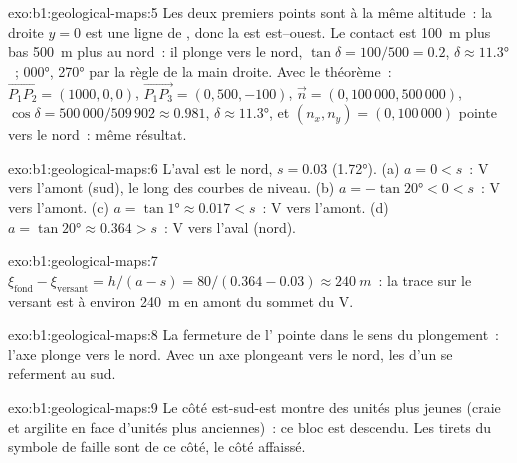 \begin{solution}{exo:b1:geological-maps:5}
Les deux premiers points sont à la même altitude~: la droite $y = 0$ est une
ligne de , donc la  est est--ouest. Le contact est \qty{100}{m}
plus bas \qty{500}{m} plus au nord~: il plonge vers le nord,
$\tan\delta = 100/500 = 0.2$, $\delta \approx \ang{11.3}$~; 
\ang{000},  \ang{270} par la règle de la main droite. Avec le
théorème~: $\overrightarrow{P_1P_2} = (1000, 0, 0)$,
$\overrightarrow{P_1P_3} = (0, 500, -100)$, $\vec n = (0, 100\,000,
500\,000)$, $\cos\delta = 500\,000/509\,902 \approx 0.981$, $\delta \approx
\ang{11.3}$, et $(n_x, n_y) = (0, 100\,000)$ pointe vers le nord~: même résultat.
\end{solution}

\begin{solution}{exo:b1:geological-maps:6}
L'aval est le nord, $s = 0.03$ (\ang{1.72}). (a) $a = 0 < s$~: V vers l'amont
(sud), le long des courbes de niveau. (b) $a = -\tan\ang{20} < 0 < s$~: V vers
l'amont. (c) $a = \tan\ang{1} \approx 0.017 < s$~: V vers l'amont. (d) $a = \tan\ang{20}
\approx 0.364 > s$~: V vers l'aval (nord).
\end{solution}

\begin{solution}{exo:b1:geological-maps:7}
$\xi_{\text{fond}} - \xi_{\text{versant}} = h/(a - s) = 80/(0.364 - 0.03)
\approx \qty{240}{m}$~: la trace sur le versant est à environ \qty{240}{m} en
amont du sommet du V.
\end{solution}

\begin{solution}{exo:b1:geological-maps:8}
La fermeture de l' pointe dans le sens du plongement~: l'axe plonge
vers le nord. Avec un axe plongeant vers le nord, les  d'un
 se referment au sud.
\end{solution}

\begin{solution}{exo:b1:geological-maps:9}
Le côté est-sud-est montre des unités plus jeunes (craie et argilite en face
d'unités plus anciennes)~: ce bloc est descendu. Les tirets du symbole de faille
sont de ce côté, le côté affaissé.
\end{solution}

